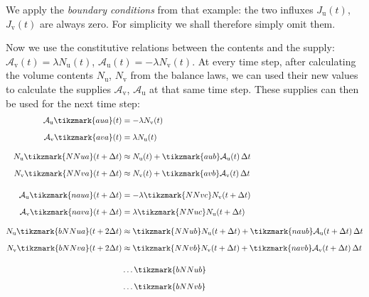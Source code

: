 \documentclass[a4paper,12pt,%
onecolumn,oneside,%
british%
]{memoir}
\newcommand*{\incr}{\Delta}%
\renewcommand*{\|}[1][]{\nonscript\:#1\vert\nonscript\:\mathopen{}}
\newcommand*{\Dt}{\incr t}
\newcommand*{\yN}{N}
\newcommand*{\yJ}{J}
\newcommand*{\ya}{\mathcal{A}}
\newcommand*{\yNu}{\yN_{\text{u}}}
\newcommand*{\yNv}{\yN_{\text{v}}}
\newcommand*{\yJu}{\yJ_{\text{u}}}
\newcommand*{\yJv}{\yJ_{\text{v}}}
\newcommand*{\yau}{\ya_{\text{u}}}
\newcommand*{\yav}{\ya_{\text{v}}}
\begin{document}
We apply the \emph{boundary conditions} from that example: the two influxes $\yJu(t)$, $\yJv(t)$ are always zero. For simplicity we shall therefore simply omit them.

Now we use the constitutive relations between the contents and the supply: $\yav(t) = \lambda \yNu(t)$, $\yau(t) = -\lambda \yNv(t)$. At every time step, after calculating the volume contents $\yNu$, $\yNv$ from the balance laws, we can used their new values to calculate the supplies $\yav$, $\yau$ at that same time step. These supplies can then be used for the next time step:
\begin{equation}\label{eq:timestepped_evolution_NA}
  \begin{aligned}[b]
    \yau\tikzmark{aua}(t) &= -\lambda \yNv(t)
    \\[2\jot]
    \yav\tikzmark{ava}(t) &= \lambda \yNu(t)
    \\[3\jot]
   \yNu\tikzmark{NNua}(t+\Dt) &\approx
   \yNu(t)
   +\tikzmark{aub}\yau(t)\,\Dt
    \\[2\jot]
   \yNv\tikzmark{NNva}(t+\Dt) &\approx
   \yNv(t)
   +\tikzmark{avb}\yav(t)\,\Dt
    \\[4\jot]
    \yau\tikzmark{naua}(t + \Dt) &= -\lambda \tikzmark{NNvc}\yNv(t + \Dt)
    \\[2\jot]
    \yav\tikzmark{nava}(t + \Dt) &= \lambda \tikzmark{NNuc}\yNu(t + \Dt)
    \\[3\jot]
    \yNu\tikzmark{bNNua}(t+2\Dt)  &\approx
    \tikzmark{NNub}\yNu(t+\Dt)
    +\tikzmark{naub}\yau(t+\Dt)\,\Dt
    \\[2\jot]
    \yNv\tikzmark{bNNva}(t+2\Dt)  &\approx
    \tikzmark{NNvb}\yNv(t+\Dt)
    +\tikzmark{navb}\yav(t+\Dt)\,\Dt
    \\[4\jot]
    &\dotso\tikzmark{bNNub}
    \\[2\jot]
    &\dotso\tikzmark{bNNvb}
  \end{aligned}
\end{equation}
\end{document}
